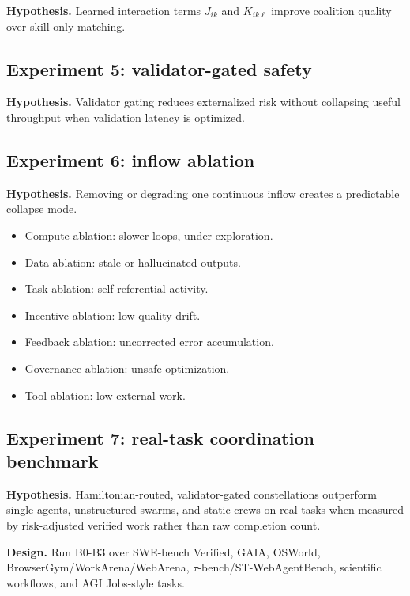 \documentclass[11pt]{article}
\providecommand{\tightlist}{\setlength{\itemsep}{0pt}\setlength{\parskip}{0pt}}
\begin{document}
\textbf{Hypothesis.} Learned interaction terms \(J_{ik}\) and \(K_{ik\ell}\) improve coalition quality over skill-only matching.

\subsection{Experiment 5: validator-gated safety}\label{experiment-5-validator-gated-safety}

\textbf{Hypothesis.} Validator gating reduces externalized risk without collapsing useful throughput when validation latency is optimized.

\subsection{Experiment 6: inflow ablation}\label{experiment-6-inflow-ablation}

\textbf{Hypothesis.} Removing or degrading one continuous inflow creates a predictable collapse mode.

\begin{itemize}
\tightlist
\item
  Compute ablation: slower loops, under-exploration.
\item
  Data ablation: stale or hallucinated outputs.
\item
  Task ablation: self-referential activity.
\item
  Incentive ablation: low-quality drift.
\item
  Feedback ablation: uncorrected error accumulation.
\item
  Governance ablation: unsafe optimization.
\item
  Tool ablation: low external work.
\end{itemize}

\subsection{Experiment 7: real-task coordination benchmark}\label{experiment-7-real-task-coordination-benchmark}

\textbf{Hypothesis.} Hamiltonian-routed, validator-gated constellations outperform single agents, unstructured swarms, and static crews on real tasks when measured by risk-adjusted verified work rather than raw completion count.

\textbf{Design.} Run B0-B3 over SWE-bench Verified, GAIA, OSWorld, BrowserGym/WorkArena/WebArena, \(\tau\)-bench/ST-WebAgentBench, scientific workflows, and AGI Jobs-style tasks.
\end{document}
